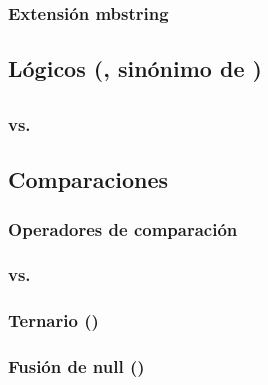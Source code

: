 \documentclass[a4paper,11pt,spanish]{sphinxmanual}
\begin{document}
\subsubsection{Extensión mbstring}
\label{\detokenize{php:extension-mbstring}}

\subsection{Lógicos (, sinónimo de )}
\label{\detokenize{php:logicos-bool-sinonimo-de-boolean}}

\subsection{}
\label{\detokenize{php:null}}

\subsubsection{ vs. }
\label{\detokenize{php:is-null-vs-null}}

\subsection{Comparaciones}
\label{\detokenize{php:comparaciones}}

\subsubsection{Operadores de comparación}
\label{\detokenize{php:operadores-de-comparacion}}

\subsubsection{\sphinxstyleliteralintitle{==} vs. \sphinxstyleliteralintitle{===}}
\label{\detokenize{php:vs}}

\subsubsection{Ternario ()}
\label{\detokenize{php:ternario}}

\subsubsection{Fusión de null ()}
\label{\detokenize{php:fusion-de-null}}
\end{document}
